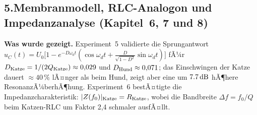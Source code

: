 ﻿\documentclass[12pt,a4paper,titlepage]{report}
\begin{document}
\subsection*{5.\enspace Membranmodell, RLC-Analogon und Impedanzanalyse
(Kapitel~6, 7 und 8)}

\textbf{Was wurde gezeigt.}
Experiment~5 validierte die Sprungantwort
$u_C(t) = U_0\bigl[1 - e^{-D\omega_0 t}(\cos\omega_d t
+ \tfrac{D}{\sqrt{1-D^2}}\sin\omega_d t)\bigr]$
fÃ¼r $D_{\rm Katze} = 1/(2Q_{\rm Katze}) \approx 0{,}029$
und $D_{\rm Hund} \approx 0{,}071$;
das Einschwingen der Katze dauert $\approx 40\,\%$ lÃ¤nger
als beim Hund, zeigt aber eine um $\SI{7{,}7}{\decibel}$ hÃ¶here
ResonanzÃ¼berhÃ¶hung.
Experiment~6 bestÃ¤tigte die Impedanzcharakteristik:
$|Z(f_0)|_{\rm Katze} = R_{\rm Katze}$, wobei die Bandbreite
$\Delta f = f_0/Q$ beim Katzen-RLC um Faktor 2,4 schmaler ausfÃ¤llt.
\end{document}
